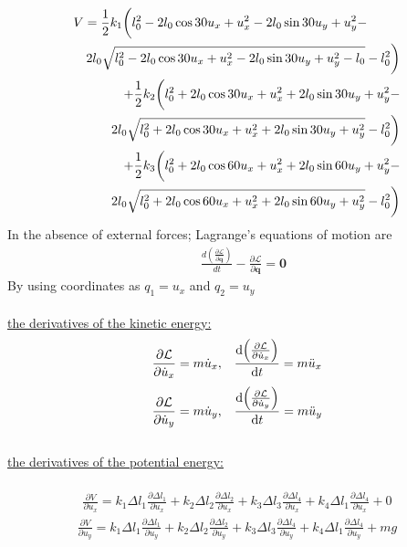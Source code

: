 \documentclass[]{report}
\begin{document}
\begin{eqnarray*}
\lefteqn{V=\frac{1}{2} k_1 \biggl({l_0^2-2l_0 \cos{30} u_x+u_x^2-2 l_0 \sin{30} u_y+u_y^2-}
}\\
&&2l_0 \sqrt{{l_0^2-2l_0 \cos{30} u_x+u_x^2-2 l_0 \sin{30} u_y+u_y^2}-l_0} -l_0^2\biggr)\\
&&+\frac{1}{2} k_2 \biggl({l_0^2+2l_0 \cos{30} u_x+u_x^2+2 l_0 \sin{30} u_y+u_y^2-}\\
&& 2l_0 \sqrt{{l_0^2+2l_0 \cos{30} u_x+u_x^2+2 l_0 \sin{30} u_y+u_y^2}} -l_0^2\biggr)\\
&&+\frac{1}{2} k_3 \biggl({l_0^2+2l_0 \cos{60} u_x+u_x^2+2 l_0 \sin{60} u_y+u_y^2-}\\
&& 2l_0 \sqrt{{l_0^2+2l_0 \cos{60} u_x+u_x^2+2 l_0 \sin{60} u_y+u_y^2}} -l_0^2\biggr)
\end{eqnarray*}
In the absence of external forces; Lagrange's equations of motion are
\begin{eqnarray*}
\quad \frac{d \left(\frac{\partial \mathcal{L}}{\partial \dot{\mathbf{q}}}\right)}{dt} -\frac{\partial \mathcal{L}}{\partial \mathbf{q}}=\mathbf{0}
\end{eqnarray*}
By using coordinates as $q_1=u_x$ and $q_2=u_y$\\
\\
\underline{the derivatives of the kinetic energy:}
\begin{eqnarray*}
\frac{ \partial \mathcal{L}}{\partial{\dot{u}_x}}=m \dot{u}_x&,&\frac{\dif\left({\frac{\partial \mathcal{L}}{\partial{\dot{u}_x}}}\right)}{\dif t}=m \ddot{u}_x
\end{eqnarray*}
\begin{eqnarray*}
\frac{ \partial \mathcal{L}}{\partial{\dot{u}_y}}=m \dot{u}_y&,&\frac{\dif\left({\frac{\partial \mathcal{L}}{\partial{\dot{u}_y}}}\right)}{\dif t}=m \ddot{u}_y
\end{eqnarray*}\\
\underline{the derivatives of the potential energy:}\\
\\
\begin{eqnarray*}
\frac{ \partial V}{\partial{u_x}}= k_1  \Delta{l_1}\frac{\partial{\Delta{l_1}}}{\partial{u}_x}+ k_2  \Delta{l_2}\frac{\partial{\Delta{l_2}}}{\partial{u}_x}+ k_3  \Delta{l_3}\frac{\partial{\Delta{l_4}}}{\partial{u}_x}+k_4  \Delta{l_1}\frac{\partial{\Delta{l_4}}}{\partial{u}_x}+0
\end{eqnarray*}
\begin{eqnarray*}
\frac{ \partial V}{\partial{u_y}}= k_1  \Delta{l_1}\frac{\partial{\Delta{l_1}}}{\partial{u}_y}+ k_2  \Delta{l_2}\frac{\partial{\Delta{l_2}}}{\partial{u}_y}+ k_3  \Delta{l_3}\frac{\partial{\Delta{l_4}}}{\partial{u}_y}+k_4  \Delta{l_1}\frac{\partial{\Delta{l_4}}}{\partial{u}_y}+mg
\end{eqnarray*}\\
\end{document}
